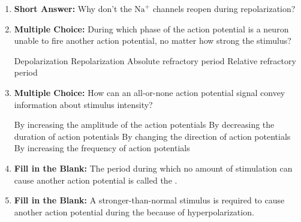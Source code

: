 \begin{enumerate}[label=\textbf{Q2.2.\arabic*}]
      \item \textbf{Short Answer:} Why don't the \(\text{Na}^{+}\) channels reopen during repolarization? \\

      \item \textbf{Multiple Choice:} During which phase of the action potential is a neuron unable to fire another action potential, no matter how strong the stimulus?
            \begin{tasks}
                  \task Depolarization
                  \task Repolarization
                  \task Absolute refractory period
                  \task Relative refractory period
            \end{tasks}

      \item \textbf{Multiple Choice:} How can an all-or-none action potential signal convey information about stimulus intensity?
            \begin{tasks}
                  \task By increasing the amplitude of the action potentials
                  \task By decreasing the duration of action potentials
                  \task By changing the direction of action potentials
                  \task By increasing the frequency of action potentials
            \end{tasks}

      \item \textbf{Fill in the Blank:} The period during which no amount of stimulation can cause another action potential is called the \underline{\hspace{3cm}}. \\

      \item \textbf{Fill in the Blank:} A stronger-than-normal stimulus is required to cause another action potential during the \underline{\hspace{3cm}} because of hyperpolarization. \\
\end{enumerate}



\newpage
